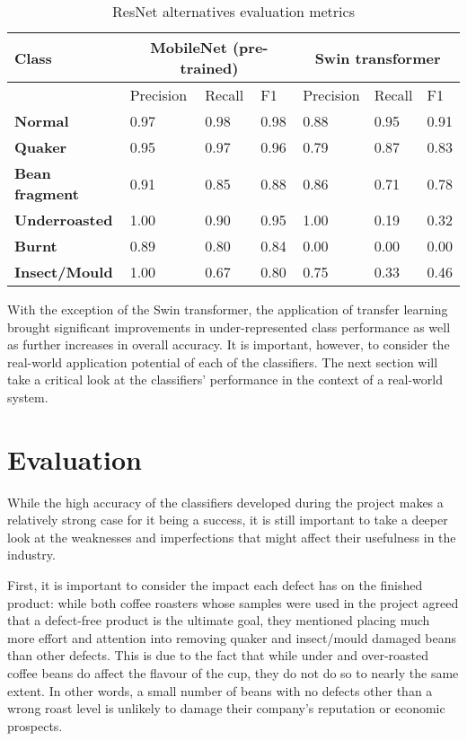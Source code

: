 \begin{table}[h]
    \centering
    \begin{tabular}{*7l}
        \toprule
        \textbf{Class} & \multicolumn{3}{c}{MobileNet (pre-trained)} & \multicolumn{3}{c}{Swin transformer} \\
        \midrule
        {} & Precision & Recall & F1 & Precision & Recall & F1 \\
        \textbf{Normal} & 0.97 & 0.98 & 0.98 & 0.88 & 0.95 & 0.91  \\
        \textbf{Quaker} & 0.95 & 0.97 & 0.96 & 0.79 & 0.87 & 0.83 \\
        \textbf{Bean fragment} & 0.91 & 0.85 & 0.88 & 0.86 & 0.71 & 0.78 \\
        \textbf{Underroasted} & 1.00 & 0.90 & 0.95 & 1.00 & 0.19 & 0.32 \\
        \textbf{Burnt} & 0.89 & 0.80 & 0.84 & 0.00 & 0.00 & 0.00 \\
        \textbf{Insect/Mould} & 1.00 & 0.67 & 0.80 & 0.75 & 0.33 & 0.46  \\
        \bottomrule
    \end{tabular}
    \caption{ResNet alternatives evaluation metrics}
    \label{tab:transfer-results-2}
\end{table}
With the exception of the Swin transformer, the application of transfer learning brought significant improvements in
under-represented class performance as well as further increases in overall accuracy.
It is important, however, to consider the real-world application potential of each of the classifiers.
The next section will take a critical look at the classifiers' performance in the context of a real-world system.
\section{Evaluation}
\label{sec:evaluation}
While the high accuracy of the classifiers developed during the project makes a relatively strong case for it being a success,
it is still important to take a deeper look at the weaknesses and imperfections that might affect their usefulness in the industry.

First, it is important to consider the impact each defect has on the finished product: while both coffee roasters whose
samples were used in the project agreed that a defect-free product is the ultimate goal, they mentioned placing much more
effort and attention into removing quaker and insect/mould damaged beans than other defects.
This is due to the fact that while under and over-roasted coffee beans do affect the flavour of the cup, they do not
do so to nearly the same extent.
In other words, a small number of beans with no defects other than a wrong roast level is unlikely to damage their company's
reputation or economic prospects.

